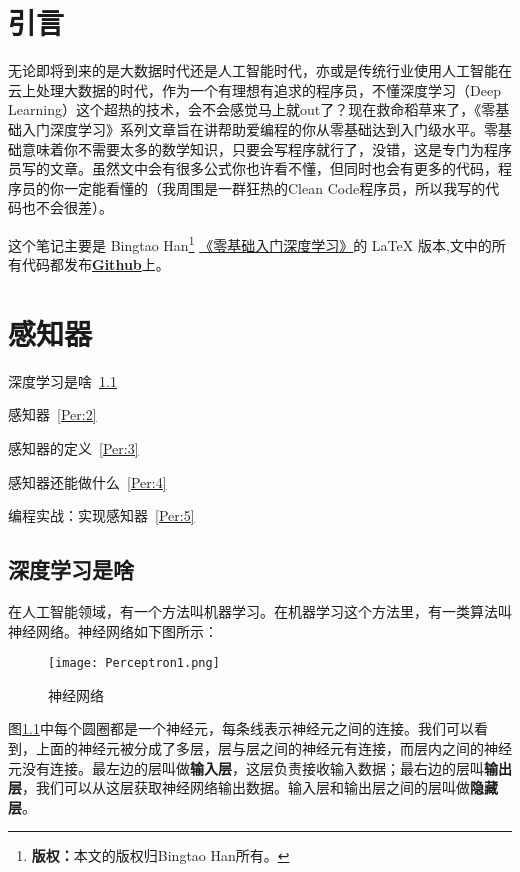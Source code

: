 \chapter*{引言}

无论即将到来的是大数据时代还是人工智能时代，亦或是传统行业使用人工智能在云上处理大数据的时代，作为一个有理想有追求的程序员，不懂深度学习（Deep Learning）这个超热的技术，会不会感觉马上就out了？现在救命稻草来了，《零基础入门深度学习》系列文章旨在讲帮助爱编程的你从零基础达到入门级水平。零基础意味着你不需要太多的数学知识，只要会写程序就行了，没错，这是专门为程序员写的文章。虽然文中会有很多公式你也许看不懂，但同时也会有更多的代码，程序员的你一定能看懂的（我周围是一群狂热的Clean Code程序员，所以我写的代码也不会很差）。

这个笔记主要是 Bingtao Han\footnote{\textbf{版权：}本文的版权归Bingtao Han所有。} \href{https://www.zybuluo.com/hanbingtao/note/433855}{《零基础入门深度学习》}的 \LaTeX{} 版本,文中的所有代码都发布\href{https://github.com/hanbt/learn_dl}{\textbf{Github}}上。




\chapter{感知器}\label{chap:Per}

\begin{introduction}
	\item 深度学习是啥~\ref{Per:1}
	\item 感知器~\ref{Per:2}
	\item 感知器的定义~\ref{Per:3}
	\item 感知器还能做什么~\ref{Per:4}
	\item 编程实战：实现感知器~\ref{Per:5}
\end{introduction}

\section{深度学习是啥}\label{Per:1}

在人工智能领域，有一个方法叫机器学习。在机器学习这个方法里，有一类算法叫神经网络。神经网络如下图所示：

\begin{figure}[htbp]
	\centering
	\texttt{[image: Perceptron1.png]}
	\caption{神经网络}
	\label{fig:Per0}
\end{figure}

图\ref{fig:Per0}中每个圆圈都是一个神经元，每条线表示神经元之间的连接。我们可以看到，上面的神经元被分成了多层，层与层之间的神经元有连接，而层内之间的神经元没有连接。最左边的层叫做\textbf{输入层}，这层负责接收输入数据；最右边的层叫\textbf{输出层}，我们可以从这层获取神经网络输出数据。输入层和输出层之间的层叫做\textbf{隐藏层}。

